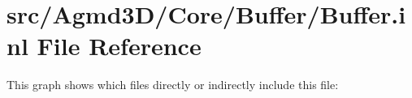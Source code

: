 \hypertarget{_buffer_8inl}{\section{src/\+Agmd3\+D/\+Core/\+Buffer/\+Buffer.inl File Reference}
\label{_buffer_8inl}
}
This graph shows which files directly or indirectly include this file\+:
